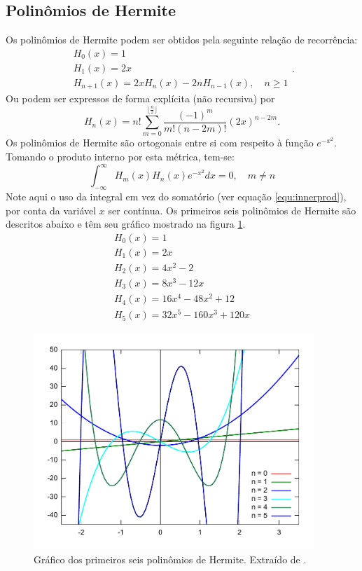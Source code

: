 \subsection*{Polinômios de Hermite}
Os polinômios de Hermite podem ser obtidos pela seguinte relação de recorrência:
\begin{equation}
     \begin{array}{l}
         H_0(x) = 1\\
         H_1(x) = 2x\\
         H_{n+1}(x) = 2xH_n(x) - 2nH_{n-1}(x), \quad n \geq 1
     \end{array}.
\end{equation}
Ou podem ser expressos de forma explícita (não recursiva) por
\begin{equation}
     H_n(x) = n! \sum_{m=0}^{\lfloor \frac{n}{2} \rfloor} \frac{\left(-1\right)^m}{m!\left(n-2m\right)!}\left(2x\right)^{n-2m}.
\end{equation}
Os polinômios de Hermite são ortogonais entre si com respeito à função $e^{-x^2}$. Tomando o produto interno por esta métrica, tem-se:
\begin{equation}
     \int_{-\infty}^{\infty} H_m(x)H_n(x)e^{-x^2}dx = 0, \quad m\neq n
\end{equation}
Note aqui o uso da integral em vez do somatório (ver equação \ref{equ:innerprod}), por conta da variável $x$ ser contínua. Os primeiros seis polinômios de Hermite são descritos abaixo e têm seu gráfico mostrado na figura \ref{fig:hermpoly}.
\begin{equation}
     \begin{array}{l}
         H_0(x) = 1\\
         H_1(x) = 2x\\
         H_2(x) = 4x^2 - 2\\
         H_3(x) = 8x^3 - 12x\\
         H_4(x) = 16x^4 - 48x^2 + 12\\
         H_5(x) = 32x^5 - 160x^3 + 120x
     \end{array}
\end{equation}

\begin{figure}[ht!]
    \centering
    \includegraphics[width=300pt]{figures/chap3-herm-polynomials.pdf}
    \caption[Gráfico dos primeiros seis polinômios de Hermite]{Gráfico dos primeiros seis polinômios de Hermite. Extraído de \cite{Damato2009}.}
    \label{fig:hermpoly}
\end{figure}


